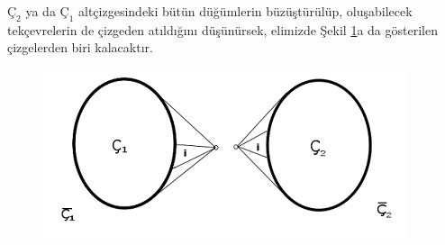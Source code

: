 \documentclass{amsbook}
\begin{document}
$Ç_2$ ya da $Ç_1$ altçizgesindeki bütün düğümlerin büzüştürülüp, oluşabilecek tekçevrelerin de çizgeden atıldığını düşünürsek, elimizde Şekil \ref{fig:my_label}a da gösterilen çizgelerden biri kalacaktır.
\begin{figure}[h]
    \centering
    \includegraphics{images/ceyhun-154-fig01.png}
    \label{fig:my_label}
\end{figure}
\end{document}
